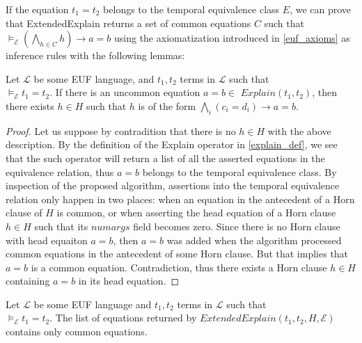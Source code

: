 If the equation $t_1 = t_2$ belongs
to the temporal equivalence class $E$, 
we can prove that ExtendedExplain returns
a set of common equations $C$ such that
$\models_{\mathcal{E}} (\bigwedge_{h \in C} h) \rightarrow a = b$
using the axiomatization introduced in \ref{euf_axioms} as 
inference rules with the following lemmas:

\begin{lemma} \label{existence_horn_in_explain}
  Let $\mathcal{L}$ be some EUF language, 
  and $t_1, t_2$ terms in 
  $\mathcal{L}$ such that \\
  $\models_{\mathcal{E}} t_1 = t_2$.
  If there is an uncommon equation $a = b \in$
  $Explain(t_1, t_2)$, then there exists $h \in H$ 
  such that $h$ is of the form 
  $\bigwedge_i (c_i = d_i) \rightarrow a = b$.
\end{lemma}

\begin{proof} Let us suppose by contradition that
  there is no $h \in H$ with the above description.
  By the definition of the Explain operator in 
  \ref{explain_def},
  we see that the such operator will return a
  list of all the asserted equations in the
  equivalence relation, thus $a = b$ belongs to 
  the temporal equivalence class. 
  By inspection of the proposed
  algorithm, assertions into the temporal equivalence
  relation only happen in two places: when an equation 
  in the antecedent of a Horn clause of $H$ is common, 
  or when asserting the head equation of a Horn clause
  $h \in H$ such that its $numargs$ field becomes
  zero.
  Since there is no Horn clause with head equaiton 
  $a = b$, then $a = b$ was added when 
  the algorithm processed common equations
  in the antecedent of some Horn clause. But that
  implies that $a = b$ is a common equation. 
  Contradiction, thus there exists a Horn clause
  $h \in H$ containing $a=b$ in its head equation.
\end{proof}

\begin{lemma}\label{extended_explain_common_lemma}

  Let $\mathcal{L}$ be some EUF language 
  and $t_1, t_2$ terms in 
  $\mathcal{L}$ such that \\
  $\models_{\mathcal{E}} t_1 = t_2$.
  The list of equations returned by $ExtendedExplain(t_1, t_2, 
  H, \mathcal{E})$ contains only common equations.
\end{lemma}

